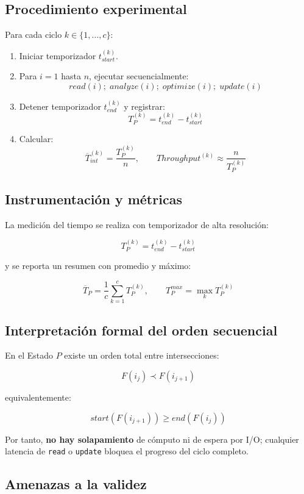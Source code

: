 \documentclass[12pt]{article}
\begin{document}
\subsection{Procedimiento experimental}

Para cada ciclo \(k \in \{1,\dots,c\}\):

\begin{enumerate}
\item Iniciar temporizador \(t_{start}^{(k)}\).
\item Para \(i = 1\) hasta \(n\), ejecutar secuencialmente:
\[
read(i);\; analyze(i);\; optimize(i);\; update(i)
\]
\item Detener temporizador \(t_{end}^{(k)}\) y registrar:
\[
T_P^{(k)} = t_{end}^{(k)} - t_{start}^{(k)}
\]
\item Calcular:
\[
\overline{T}_{int}^{(k)} = \frac{T_P^{(k)}}{n},
\qquad
Throughput^{(k)} \approx \frac{n}{T_P^{(k)}}
\]
\end{enumerate}

\subsection{Instrumentación y métricas}

La medición del tiempo se realiza con temporizador de alta resolución:

\[
T_P^{(k)} = t_{end}^{(k)} - t_{start}^{(k)}
\]

y se reporta un resumen con promedio y máximo:

\[
\overline{T}_P = \frac{1}{c}\sum_{k=1}^{c} T_P^{(k)},
\qquad
T_P^{max} = \max_k T_P^{(k)}
\]

\subsection{Interpretación formal del orden secuencial}

En el Estado \(P\) existe un orden total entre intersecciones:

\[
F(i_j) \prec F(i_{j+1})
\]

equivalentemente:

\[
start(F(i_{j+1})) \ge end(F(i_j))
\]

Por tanto, \textbf{no hay solapamiento} de cómputo ni de espera por I/O; cualquier latencia de \texttt{read} o
\texttt{update} bloquea el progreso del ciclo completo.

\subsection{Amenazas a la validez}
\end{document}
